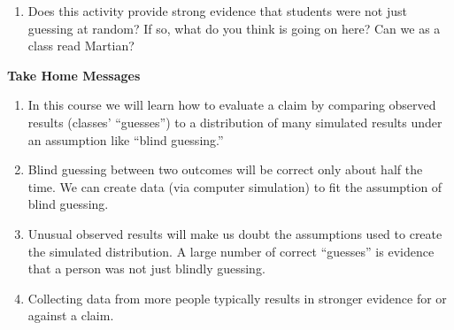 \documentclass[
]{article}
\providecommand{\tightlist}{%
  \setlength{\itemsep}{0pt}\setlength{\parskip}{0pt}}
\begin{document}
\vspace{1in}

\begin{enumerate}
\def\labelenumi{\arabic{enumi}.}
\setcounter{enumi}{17}
\tightlist
\item
  Does this activity provide strong evidence that students were not just
  guessing at random? If so, what do you think is going on here? Can we
  as a class read Martian?
\end{enumerate}

\vspace{1in}

\textbf{Take Home Messages}

\begin{enumerate}
\def\labelenumi{\arabic{enumi}.}
\item
  In this course we will learn how to evaluate a claim by comparing
  observed results (classes' ``guesses'') to a distribution of many
  simulated results under an assumption like ``blind guessing.''
\item
  Blind guessing between two outcomes will be correct only about half
  the time. We can create data (via computer simulation) to fit the
  assumption of blind guessing.
\item
  Unusual observed results will make us doubt the assumptions used to
  create the simulated distribution. A large number of correct
  ``guesses'' is evidence that a person was not just blindly guessing.
\item
  Collecting data from more people typically results in stronger
  evidence for or against a claim.
\end{enumerate}
\end{document}

